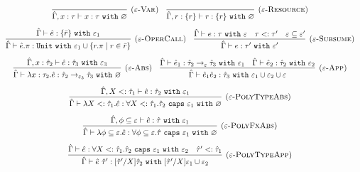 \documentclass{llncs}
\newcommand{\keywadj}[1]{\mathtt{#1}}
\newcommand{\keyw}[1]{\keywadj{#1}~}
\newcommand{\kw}[1]{\keyw{ #1 }}
\newcommand{\poly}[2]{
	\forall #1. #2
}
\newcommand{\polycap}[3]{
	\forall #1. #2~ \kw{caps} #3
}
\begin{document}
\[
\begin{array}{c}

\infer[\textsc{($\varepsilon$-Var)}]
	{ \hat \Gamma, x:\tau \vdash x: \tau~\kw{with} \varnothing }
	{}
~~~
\infer[\textsc{($\varepsilon$-Resource)}]
 	{ \hat \Gamma, r: \{ r \} \vdash r : \{ r \}~\kw{with} \varnothing }
 	{}\\[2ex]
 

\infer[\textsc{($\varepsilon$-OperCall)}]
	{ \hat \Gamma \vdash \hat e.\pi: \kw{Unit} \kw{with} \varepsilon_1 \cup \{ r.\pi \mid r \in \bar r \} }
	{ \hat \Gamma \vdash \hat e: \{ \bar r \}~\kw{with} \varepsilon_1}
~~~
\infer[\textsc{($\varepsilon$-Subsume)}]
	{\hat \Gamma \vdash e: \tau' ~\kw{with} \varepsilon'}
	{\hat \Gamma \vdash e: \tau ~\kw{with} \varepsilon & \tau <: \tau' & \varepsilon \subseteq \varepsilon'}\\[2ex]

	\infer[\textsc{($\varepsilon$-Abs)}]
	{ \hat \Gamma \vdash \lambda x:\tau_2 . \hat e : \hat \tau_2 \rightarrow_{\varepsilon_3} \hat \tau_3~\kw{with} \varnothing }
	{ \hat \Gamma, x: \hat \tau_2 \vdash \hat e: \hat \tau_3~\kw{with} \varepsilon_3 }
	~~~
\infer[\textsc{($\varepsilon$-App)}]
	{ \hat \Gamma \vdash \hat e_1 \hat e_2 : \hat \tau_3~\kw{with} \varepsilon_1 \cup \varepsilon_2 \cup \varepsilon  }
	{ \hat \Gamma \vdash \hat e_1: \hat \tau_2 \rightarrow_{\varepsilon} \hat \tau_3~\kw{with} \varepsilon_1 & \hat \Gamma \vdash \hat e_2: \hat \tau_2~\kw{with} \varepsilon_2 } \\[2ex]

\infer[\textsc{($\varepsilon$-PolyTypeAbs)}]
	{ \hat \Gamma \vdash \lambda X <: \hat \tau_1. \hat e : \poly{X <: \hat \tau_1}{\hat \tau_2}~\kw{caps} \varepsilon_1~\kw{with} \varnothing }
	{ \hat \Gamma, X <: \hat \tau_1 \vdash \hat e: \hat \tau_2 ~\kw{with} \varepsilon_1 } \\[2ex]

\infer[\textsc{($\varepsilon$-PolyFxAbs)}]
	{ \hat \Gamma \vdash \lambda \phi \subseteq \varepsilon. \hat e : \forall \phi \subseteq \varepsilon. \hat \tau~\kw{caps} \varepsilon_1~\kw{with} \varnothing }
	{ \hat \Gamma, \phi \subseteq \varepsilon \vdash \hat e : \hat \tau ~\kw{with} \varepsilon_1 } \\[2ex]

\infer[\textsc{($\varepsilon$-PolyTypeApp)}]
	{ \hat \Gamma \vdash \hat e~\hat \tau' : [\hat \tau'/X]\hat \tau_2~\kw{with}  [\hat \tau'/X]\varepsilon_1 \cup \varepsilon_2 }
	{ \hat \Gamma \vdash \hat e: \polycap{X <: \hat \tau_1}{\hat \tau_2}{\varepsilon_1}~\kw{with} \varepsilon_2 & \hat \tau' <: \hat \tau_1} \\[2ex]


\end{array}\]
\end{document}
